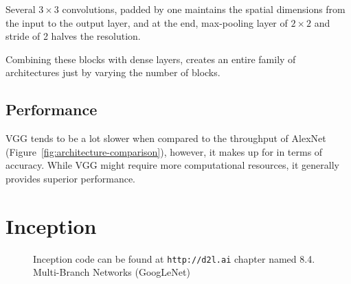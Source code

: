 \documentclass[11pt]{article}
\begin{document}
Several $3\times 3$ convolutions, padded by one maintains the spatial dimensions from the input to the output layer, and at the end, max-pooling layer of $ 2\times2$ and stride of 2 halves the resolution. 

Combining these blocks with dense layers, creates an entire family of architectures just by varying the number of blocks.

\subsection{Performance}

VGG tends to be a lot slower when compared to the throughput of AlexNet (Figure~\ref{fig:architecture-comparison}), however, it makes up for in terms of accuracy. While VGG might require more computational resources, it generally provides superior performance.

\section{Inception}

\begin{figure}
    \centering
    \caption{Inception code can be found at \texttt{http://d2l.ai} chapter named 8.4. Multi-Branch Networks (GoogLeNet)}
\end{figure}
\end{document}
